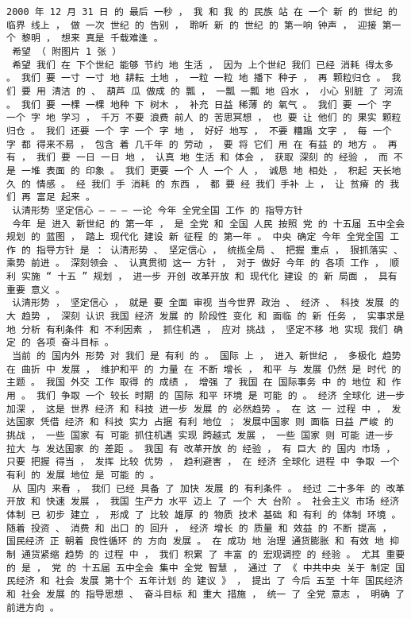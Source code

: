 \documentclass{article}
\begin{document}
\begin{Verbatim}[commandchars=\\\{\}]
 2000 年 12 月 31 日 的 最后 一秒 ， 我 和 我 的 民族 站 在 一个 新 的 世纪 的 临界 线上 ， 做 一次 世纪 的 告别 ， 聆听 新 的 世纪 的 第一响 钟声 ， 迎接 第一个 黎明 ， 想来 真是 千载难逢 。 
 希望 （ 附图片 1 张 ） 
 希望 我们 在 下个世纪 能够 节约 地 生活 ， 因为 上个世纪 我们 已经 消耗 得太多 。 我们 要 一寸 一寸 地 耕耘 土地 ， 一粒 一粒 地 播下 种子 ， 再 颗粒归仓 。 我们 要 用 清洁 的 、 葫芦 瓜 做成 的 瓢 ， 一瓢 一瓢 地 舀水 ， 小心 别脏 了 河流 。 我们 要 一棵 一棵 地种 下 树木 ， 补充 日益 稀薄 的 氧气 。 我们 要 一个 字 一个 字 地 学习 ， 千万 不要 浪费 前人 的 苦思冥想 ， 也 要 让 他们 的 果实 颗粒归仓 。 我们 还要 一个 字 一个 字 地 ， 好好 地写 ， 不要 糟蹋 文字 ， 每 一个 字 都 得来不易 ， 包含 着 几千年 的 劳动 ， 要 将 它们 用 在 有益 的 地方 。 再有 ， 我们 要 一日 一日 地 ， 认真 地 生活 和 体会 ， 获取 深刻 的 经验 ， 而 不是 一堆 表面 的 印象 。 我们 更要 一个 人 一个 人 ， 诚恳 地 相处 ， 积起 天长地久 的 情感 。 经 我们 手 消耗 的 东西 ， 都 要 经 我们 手补 上 ， 让 贫瘠 的 我们 再 富足 起来 。 
 认清形势 坚定信心 — — — 一论 今年 全党全国 工作 的 指导方针 
 今年 是 进入 新世纪 的 第一年 ， 是 全党 和 全国 人民 按照 党 的 十五届 五中全会 规划 的 蓝图 ， 踏上 现代化 建设 新 征程 的 第一年 。 中央 确定 今年 全党全国 工作 的 指导方针 是 ： 认清形势 、 坚定信心 ， 统揽全局 、 把握 重点 ， 狠抓落实 、 乘势 前进 。 深刻领会 、 认真贯彻 这一 方针 ， 对于 做好 今年 的 各项 工作 ， 顺利 实施 “ 十五 ” 规划 ， 进一步 开创 改革开放 和 现代化 建设 的 新 局面 ， 具有 重要 意义 。 
 认清形势 ， 坚定信心 ， 就是 要 全面 审视 当今世界 政治 、 经济 、 科技 发展 的 大 趋势 ， 深刻 认识 我国 经济 发展 的 阶段性 变化 和 面临 的 新 任务 ， 实事求是 地 分析 有利条件 和 不利因素 ， 抓住机遇 ， 应对 挑战 ， 坚定不移 地 实现 我们 确定 的 各项 奋斗目标 。 
 当前 的 国内外 形势 对 我们 是 有利 的 。 国际 上 ， 进入 新世纪 ， 多极化 趋势 在 曲折 中 发展 ， 维护和平 的 力量 在 不断 增长 ， 和平 与 发展 仍然 是 时代 的 主题 。 我国 外交 工作 取得 的 成绩 ， 增强 了 我国 在 国际事务 中 的 地位 和 作用 。 我们 争取 一个 较长 时期 的 国际 和平 环境 是 可能 的 。 经济 全球化 进一步 加深 ， 这是 世界 经济 和 科技 进一步 发展 的 必然趋势 。 在 这 一 过程 中 ， 发达国家 凭借 经济 和 科技 实力 占据 有利 地位 ； 发展中国家 则 面临 日益 严峻 的 挑战 ， 一些 国家 有 可能 抓住机遇 实现 跨越式 发展 ， 一些 国家 则 可能 进一步 拉大 与 发达国家 的 差距 。 我国 有 改革开放 的 经验 ， 有 巨大 的 国内 市场 ， 只要 把握 得当 ， 发挥 比较 优势 ， 趋利避害 ， 在 经济 全球化 进程 中 争取 一个 有利 的 发展 地位 是 可能 的 。 
 从 国内 来看 ， 我们 已经 具备 了 加快 发展 的 有利条件 。 经过 二十多年 的 改革开放 和 快速 发展 ， 我国 生产力 水平 迈上 了 一个 大 台阶 。 社会主义 市场 经济体制 已 初步 建立 ， 形成 了 比较 雄厚 的 物质 技术 基础 和 有利 的 体制 环境 。 随着 投资 、 消费 和 出口 的 回升 ， 经济 增长 的 质量 和 效益 的 不断 提高 ， 国民经济 正 朝着 良性循环 的 方向 发展 。 在 成功 地 治理 通货膨胀 和 有效 地 抑制 通货紧缩 趋势 的 过程 中 ， 我们 积累 了 丰富 的 宏观调控 的 经验 。 尤其 重要 的 是 ， 党 的 十五届 五中全会 集中 全党 智慧 ， 通过 了 《 中共中央 关于 制定 国民经济 和 社会 发展 第十个 五年计划 的 建议 》 ， 提出 了 今后 五至 十年 国民经济 和 社会 发展 的 指导思想 、 奋斗目标 和 重大 措施 ， 统一 了 全党 意志 ， 明确 了 前进方向 。 

\end{Verbatim}
\end{document}
